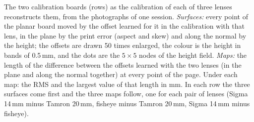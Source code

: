 The two calibration boards (rows) as the calibration of each of three lenses reconstructs them, from the photographs of one session. \emph{Surfaces:} every point of the planar board moved by the offset learned for it in the calibration with that lens, in the plane by the print error (aspect and skew) and along the normal by the height; the offsets are drawn 50 times enlarged, the colour is the height in bands of 0.5\,mm, and the dots are the $5\times5$ nodes of the height field. \emph{Maps:} the length of the difference between the offsets learned with the two lenses (in the plane and along the normal together) at every point of the page. Under each map: the RMS and the largest value of that length in mm. In each row the three surfaces come first and the three maps follow, one for each pair of lenses (Sigma 14\,mm minus Tamron 20\,mm, fisheye minus Tamron 20\,mm, Sigma 14\,mm minus fisheye).

